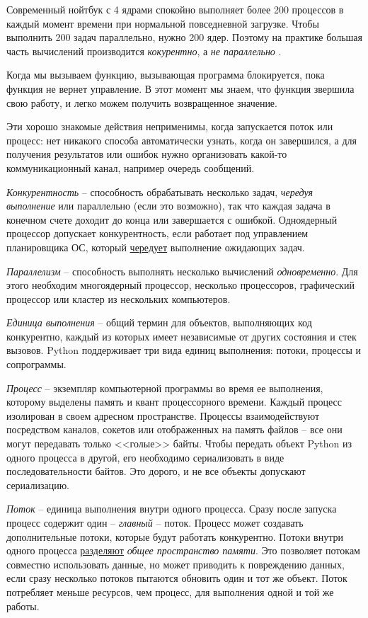 \documentclass[%
	11pt,
	a4paper,
	utf8,
		]{article}
\begin{document}
Современный нойтбук с 4 ядрами спокойно выполняет более 200 процессов в каждый момент времени при нормальной повседневной загрузке. Чтобы выполнить 200 задач параллельно, нужно 200 ядер. Поэтому на практике большая часть вычислений производится \emph{кокурентно}, а \emph{не параллельно} \cite[]{ramalho:python-2022}.

Когда мы вызываем функцию, вызывающая программа блокируется, пока функция не вернет управление. В этот момент мы знаем, что функция звершила свою работу, и легко можем получить возвращенное значение.

Эти хорошо знакомые действия неприменимы, когда запускается поток или процесс: нет никакого способа автоматически узнать, когда он завершился, а для получения результатов или ошибок нужно организовать какой-то коммуникационный канал, например очередь сообщений.

\emph{Конкурентность} -- способность обрабатывать несколько задач, \emph{чередуя выполнение} или параллельно (если это возможно), так что каждая задача в конечном счете доходит до конца или завершается с ошибкой. Одноядерный процессор допускает конкурентность, если работает под управлением планировщика ОС, который \underline{чередует} выполнение ожидающих задач.

\emph{Параллелизм} -- способность выполнять несколько вычислений \emph{одновременно}. Для этого необходим многоядерный процессор, несколько процессоров, графический процессор или кластер из нескольких компьютеров.

\emph{Единица выполнения} -- общий термин для объектов, выполняющих код конкурентно, каждый из которых имеет независимые от других состояния и стек вызовов. Python поддерживает три вида единиц выполнения: потоки, процессы и сопрограммы.

\emph{Процесс} -- экземпляр компьютерной программы во время ее выполнения, которому выделены память и квант процессорного времени. Каждый процесс изолирован в своем адресном пространстве. Процессы взаимодействуют посредством каналов, сокетов или отображенных на память файлов -- все они могут передавать только <<голые>> байты. Чтобы передать объект Python из одного процесса в другой, его необходимо сериализовать в виде последовательности байтов. Это дорого, и не все объекты допускают сериализацию.

\emph{Поток} -- единица выполнения внутри одного процесса. Сразу после запуска процесс содержит один -- \emph{главный} -- поток. Процесс может создавать дополнительные потоки, которые будут работать конкурентно. Потоки внутри одного процесса \underline{разделяют} \emph{общее пространство памяти}. Это позволяет потокам совместно использовать данные, но может приводить к повреждению данных, если сразу несколько потоков пытаются обновить один и тот же объект. Поток потребляет меньше ресурсов, чем процесс, для выполнения одной и той же работы.
\end{document}
